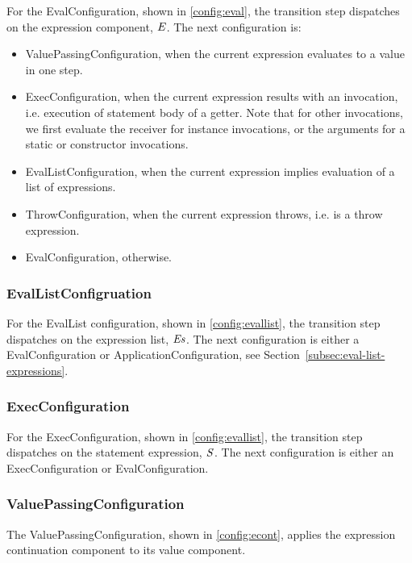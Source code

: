 \documentclass{article}
\begin{document}
For the EvalConfiguration, shown in \ref{config:eval}, the transition step dispatches on the expression component, $\mathit{E}$.
The next configuration is:
\begin{itemize}
\item ValuePassingConfiguration, when the current expression evaluates to a value in one step.
\item ExecConfiguration, when the current expression results with an invocation, i.e. execution of statement body of a getter.
Note that for other invocations, we first evaluate the receiver for instance invocations, or the arguments for a static or constructor invocations.
\item EvalListConfiguration, when the current expression implies evaluation of a list of expressions.
\item ThrowConfiguration, when the current expression throws, i.e. is a throw expression.
\item EvalConfiguration, otherwise.
\end{itemize}

\subsubsection{EvalListConfigruation}
\label{subsubsec:evallistconfig}

For the EvalList configuration, shown in \ref{config:evallist}, the transition step dispatches on the expression list, $\mathit{E}\mathit{s}$.
The next configuration is either a EvalConfiguration or ApplicationConfiguration, see Section~\ref{subsec:eval-list-expressions}.

\subsubsection{ExecConfiguration}
\label{subsubsec:execconfig}

For the ExecConfiguration, shown in \ref{config:evallist}, the transition step dispatches on the statement expression, $\mathit{S}$.
The next configuration is either an ExecConfiguration or EvalConfiguration.

\subsubsection{ValuePassingConfiguration}
\label{suubsubsec:valuepassingconfig}

The ValuePassingConfiguration, shown in \ref{config:econt}, applies the expression continuation component to its value component.
\end{document}
